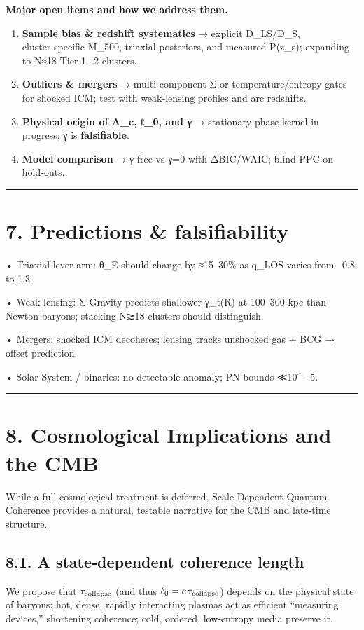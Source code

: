 \documentclass[11pt,a4paper]{article}
\begin{document}
\textbf{Major open items and how we address them.}

\begin{enumerate}
\item \textbf{Sample bias \& redshift systematics} → explicit D\_LS/D\_S, cluster‑specific M\_500, triaxial posteriors, and measured P(z\_s); expanding to N≈18 Tier‑1+2 clusters.
\item \textbf{Outliers \& mergers} → multi‑component Σ or temperature/entropy gates for shocked ICM; test with weak‑lensing profiles and arc redshifts.
\item \textbf{Physical origin of A\_c, ℓ\_0, and γ} → stationary‑phase kernel in progress; γ is \textbf{falsifiable}.
\item \textbf{Model comparison} → γ‑free vs γ=0 with ΔBIC/WAIC; blind PPC on hold‑outs.
\end{enumerate}


\medskip\hrule\medskip


\section{7. Predictions \& falsifiability}


• Triaxial lever arm: θ\_E should change by ≈15–30\% as q\_LOS varies from ~0.8 to 1.3.  

• Weak lensing: Σ‑Gravity predicts shallower γ\_t(R) at 100–300 kpc than Newton‑baryons; stacking N≳18 clusters should distinguish.  

• Mergers: shocked ICM decoheres; lensing tracks unshocked gas + BCG → offset prediction.  

• Solar System / binaries: no detectable anomaly; PN bounds ≪10^−5.


\medskip\hrule\medskip


\section{8. Cosmological Implications and the CMB}


While a full cosmological treatment is deferred, Scale‑Dependent Quantum Coherence provides a natural, testable narrative for the CMB and late‑time structure.


\subsection{8.1. A state‑dependent coherence length}


We propose that $\tau_{\rm collapse}$ (and thus $\ell_0=c\,\tau_{\rm collapse}$) depends on the physical state of baryons: hot, dense, rapidly interacting plasmas act as efficient “measuring devices,” shortening coherence; cold, ordered, low‑entropy media preserve it.
\end{document}
